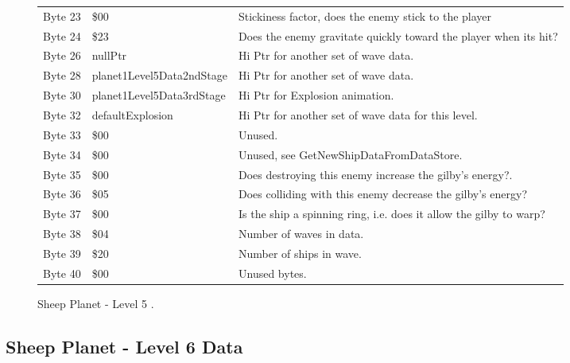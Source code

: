 \begin{figure}[H]
{\begin{adjustbox}{width=12cm}
\begin{tabular}{lll}
 Byte 23 & \$00                       & Stickiness factor, does the enemy stick to the player              \\
 Byte 24 & \$23                       & Does the enemy gravitate quickly toward the player when its hit?   \\
 Byte 26 & nullPtr                   & Hi Ptr for another set of wave data.                               \\
 Byte 28 & planet1Level5Data2ndStage & Hi Ptr for another set of wave data.                               \\
 Byte 30 & planet1Level5Data3rdStage & Hi Ptr for Explosion animation.                                    \\
 Byte 32 & defaultExplosion          & Hi Ptr for another set of wave data for this level.                \\
 Byte 33 & \$00                       & Unused.                                                            \\
 Byte 34 & \$00                       & Unused, see GetNewShipDataFromDataStore.                           \\
 Byte 35 & \$00                       & Does destroying this enemy increase the gilby's energy?.           \\
 Byte 36 & \$05                       & Does colliding with this enemy decrease the gilby's energy?        \\
 Byte 37 & \$00                       & Is the ship a spinning ring, i.e. does it allow the gilby to warp? \\
 Byte 38 & \$04                       & Number of waves in data.                                           \\
 Byte 39 & \$20                       & Number of ships in wave.                                           \\
 Byte 40 & \$00                       & Unused bytes.                                                      \\
\bottomrule
\end{tabular}

  \end{adjustbox}

  }\caption*{Sheep Planet - Level 5
.}
\end{figure}

\clearpage
\subsection{Sheep Planet - Level 6 Data}

